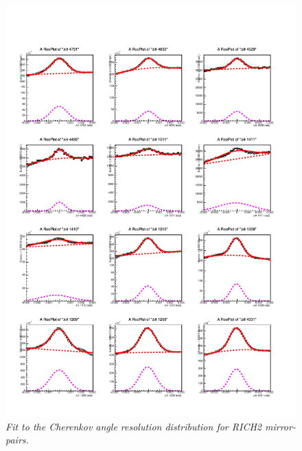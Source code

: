 \begin{figure}[!h]
	\vspace*{-0.cm}
	\begin{center}
		\includegraphics[width=1.\textwidth]{rich2_p4.pdf}
		\vspace*{-1.5cm}
	\end{center}
	\caption{\textit{Fit to the Cherenkov angle resolution distribution for RICH2 mirror-pairs.}}
	\label{fig:rich2p4}
\end{figure}
\clearpage
